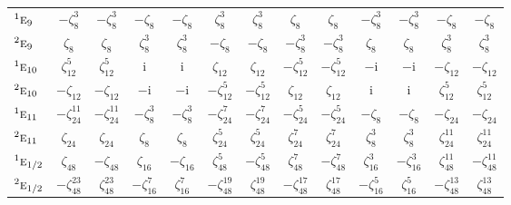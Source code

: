 \documentclass[10pt,a4paper]{article}
\makeatletter
\def\grouprule#1#2{\noalign{\marks\LTgroupmarks{\the\belowrulesep}\nobreak\vskip#1%
  \vskip\aboverulesep}\multispan\LT@cols\unskip{\leaders\hrule\@height#2\hfill\kern\z@}\cr
  \noalign{\penalty\LTrulebreak\vskip\belowrulesep\global\@lastruleclass\z@}}
\numberwithin{equation}{section}
\newcommand{\irr}[1]{\text{\normalfont\scshape #1}}
\newcommand{\conjpair}[1]{{}^{#1}}
\newcommand{\iunit}{\mathrm{i}}
\newcommand{\rootunity}[1]{\zeta_{#1}}
\makeatother
\begin{document}
{\begin{longtable}{@{}lcccccccccccc@{}}
$\conjpair{1}\irr{e}_{9}$ & $-\rootunity{8}^{3}$ & $-\rootunity{8}^{3}$ & $-\rootunity{8}$ & $-\rootunity{8}$ & $\rootunity{8}^{3}$ & $\rootunity{8}^{3}$ & $\rootunity{8}$ & $\rootunity{8}$ & $-\rootunity{8}^{3}$ & $-\rootunity{8}^{3}$ & $-\rootunity{8}$ & $-\rootunity{8}$\\
$\conjpair{2}\irr{e}_{9}$ & $\rootunity{8}$ & $\rootunity{8}$ & $\rootunity{8}^{3}$ & $\rootunity{8}^{3}$ & $-\rootunity{8}$ & $-\rootunity{8}$ & $-\rootunity{8}^{3}$ & $-\rootunity{8}^{3}$ & $\rootunity{8}$ & $\rootunity{8}$ & $\rootunity{8}^{3}$ & $\rootunity{8}^{3}$\\
$\conjpair{1}\irr{e}_{10}$ & $\rootunity{12}^{5}$ & $\rootunity{12}^{5}$ & $\iunit{}$ & $\iunit{}$ & $\rootunity{12}$ & $\rootunity{12}$ & $-\rootunity{12}^{5}$ & $-\rootunity{12}^{5}$ & $-\iunit{}$ & $-\iunit{}$ & $-\rootunity{12}$ & $-\rootunity{12}$\\
$\conjpair{2}\irr{e}_{10}$ & $-\rootunity{12}$ & $-\rootunity{12}$ & $-\iunit{}$ & $-\iunit{}$ & $-\rootunity{12}^{5}$ & $-\rootunity{12}^{5}$ & $\rootunity{12}$ & $\rootunity{12}$ & $\iunit{}$ & $\iunit{}$ & $\rootunity{12}^{5}$ & $\rootunity{12}^{5}$\\
$\conjpair{1}\irr{e}_{11}$ & $-\rootunity{24}^{11}$ & $-\rootunity{24}^{11}$ & $-\rootunity{8}^{3}$ & $-\rootunity{8}^{3}$ & $-\rootunity{24}^{7}$ & $-\rootunity{24}^{7}$ & $-\rootunity{24}^{5}$ & $-\rootunity{24}^{5}$ & $-\rootunity{8}$ & $-\rootunity{8}$ & $-\rootunity{24}$ & $-\rootunity{24}$\\
$\conjpair{2}\irr{e}_{11}$ & $\rootunity{24}$ & $\rootunity{24}$ & $\rootunity{8}$ & $\rootunity{8}$ & $\rootunity{24}^{5}$ & $\rootunity{24}^{5}$ & $\rootunity{24}^{7}$ & $\rootunity{24}^{7}$ & $\rootunity{8}^{3}$ & $\rootunity{8}^{3}$ & $\rootunity{24}^{11}$ & $\rootunity{24}^{11}$\\
\grouprule{0pt}{\lightrulewidth}
$\conjpair{1}\irr{e}_{1/2}$ & $\rootunity{48}$ & $-\rootunity{48}$ & $\rootunity{16}$ & $-\rootunity{16}$ & $\rootunity{48}^{5}$ & $-\rootunity{48}^{5}$ & $\rootunity{48}^{7}$ & $-\rootunity{48}^{7}$ & $\rootunity{16}^{3}$ & $-\rootunity{16}^{3}$ & $\rootunity{48}^{11}$ & $-\rootunity{48}^{11}$\\
$\conjpair{2}\irr{e}_{1/2}$ & $-\rootunity{48}^{23}$ & $\rootunity{48}^{23}$ & $-\rootunity{16}^{7}$ & $\rootunity{16}^{7}$ & $-\rootunity{48}^{19}$ & $\rootunity{48}^{19}$ & $-\rootunity{48}^{17}$ & $\rootunity{48}^{17}$ & $-\rootunity{16}^{5}$ & $\rootunity{16}^{5}$ & $-\rootunity{48}^{13}$ & $\rootunity{48}^{13}$\\

\end{longtable}}
\end{document}
